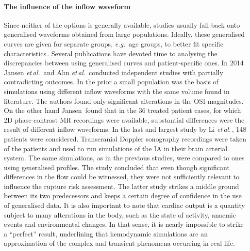\paragraph{The influence of the inflow waveform}
Since neither of the options is generally available, studies usually fall back onto generalised waveforms obtained from large populations. Ideally, these generalised curves are given for separate groups, \textit{e.g.} \,age groups, to better fit specific characteristics\,\cite{Hoi2011}. Several publications have devoted time to analysing the discrepancies between using generalised curves and patient-specific ones. In 2014 Jansen \textit{et\,al.}\,\cite{I.G.H.2014} and Ahn \textit{et\,al.}\,\cite{Ahn2014} conducted independent studies with partially contradicting outcomes. In the prior a small population was the basis of simulations using different inflow waveforms with the same volume found in literature. The authors found only significant alterations in the OSI magnitudes. On the other hand Jansen\,\cite{I.G.H.2014} found that in the 36 treated patient cases, for which 2D phase-contrast MR recordings were available, substantial differences were the result of different inflow waveforms. In the last and largest study by Li \textit{et\,al.}\,\cite{Li2020}, 148 patients were considered. Transcranial Doppler sonography recordings were taken of the patients and used to run simulations of the IA in their brain arterial system. The same simulations, as in the previous studies, were compared to ones using generalised profiles. The study concluded that even though significant differences in the flow could be witnessed, they were not sufficiently relevant to influence the rupture risk assessment. The latter study strikes a middle ground between its two predecessors and keeps a certain degree of confidence in the use of generalised data. It is also important to note that cardiac output is a quantity subject to many alterations in the body, such as the state of activity, anaemic events and environmental changes. In that sense, it is nearly impossible to strike a ``perfect'' result, underlining that hemodynamic simulations are an approximation of the complex and transient phenomena occurring in real life.

